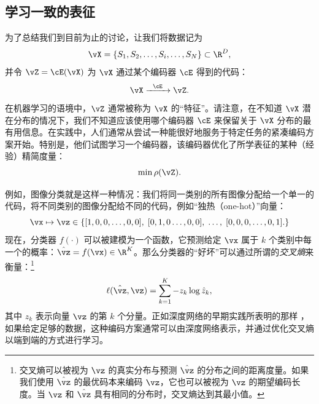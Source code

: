 \documentclass[../../book-main_zh.tex]{subfiles}
\begin{document}
\subsection{学习一致的表征}

\label{sec:consistency}

为了总结我们到目前为止的讨论，让我们将数据记为
\begin{equation}
    \vX = \{S_{1}, S_{2}, \ldots, S_{i}, \ldots, S_{N}\} \subset \R^{D},
\end{equation}
并令 \(\vZ = \cE(\vX)\) 为 \(\vX\) 通过某个编码器 \(\cE\) 得到的代码：
\begin{equation}
    \vX  \xrightarrow{\hspace{2mm} \cE\hspace{2mm}} \vZ.
    \label{eqn:open-loop}
\end{equation}
在机器学习的语境中，\(\vZ\) 通常被称为 \(\vX\) 的“特征”。请注意，在不知道 \(\vX\)
潜在分布的情况下，我们不知道应该使用哪个编码器 \(\cE\) 来保留关于 \(\vX\)
分布的最有用信息。在实践中，人们通常从尝试一种能很好地服务于特定任务的紧凑编码方案开始。特别是，他们试图学习一个编码器，该编码器优化了所学表征的某种（经验）精简度量：
\begin{equation}
    \min \rho(\vZ).
\end{equation}

\begin{example}\label{example:image_classification_feature_learning}
    例如，图像分类就是这样一种情况：我们将同一类别的所有图像分配给一个单一的代码，将不同类别的图像分配给不同的代码，例如“独热（one-hot）”向量：
    \begin{equation}
        \vx \mapsto \vz \in \{  [1, 0, 0, \ldots , 0, 0], \;  [0, 1,
        0 \ldots, 0, 0], \; \ldots, \;  [0,0,0, \ldots, 0, 1].\}
        \label{eqn:class-labels}
    \end{equation}
    现在，分类器 \(f(\cdot)\) 可以被建模为一个函数，它预测给定 \(\vx\) 属于 \(k\)
    个类别中每一个的概率：\(\hat{\vz} = f(\vx) \in
    \R^{K}\)。那么分类器的“好坏”可以通过所谓的{\em 交叉熵}来衡量：\footnote{交叉熵可以被视为 \(\vz\)
        的真实分布与预测 \(\hat{\vz}\) 的分布之间的距离度量。如果我们使用 \(\hat{\vz}\) 的最优码本来编码
        \(\vz\)，它也可以被视为 \(\vz\) 的期望编码长度。当 \(\vz\) 和 \(\hat{\vz}\)
    具有相同的分布时，交叉熵达到其最小值。}
    \begin{equation}
        \ell(\hat{\vz}, \vz) = \sum_{k=1}^{K} - z_{k} \log \hat{z}_{k},
    \end{equation}
    其中 \(z_{k}\) 表示向量 \(\vz\) 的第 \(k\) 个分量。正如深度网络的早期实践所表明的那样
    \cite{krizhevsky2012imagenet}，如果给定足够的数据，这种编码方案通常可以由深度网络表示，并通过优化交叉熵以端到端的方式进行学习。
\end{example}
\end{document}
